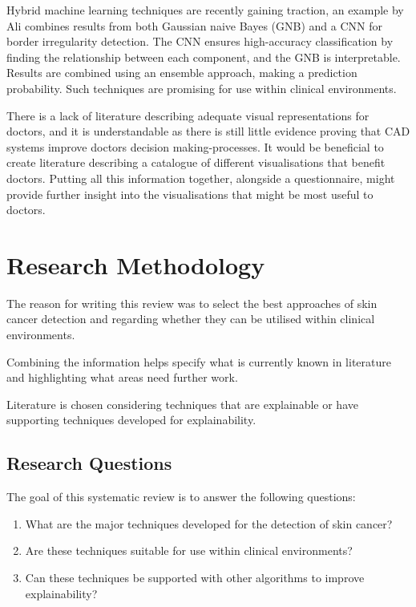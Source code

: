 Hybrid machine learning techniques are recently gaining traction, an example by Ali combines results from both Gaussian naive Bayes (GNB) and a CNN\cite{Ali2020b} for border irregularity detection. The CNN ensures high-accuracy classification by finding the relationship between each component, and the GNB is interpretable. Results are combined using an ensemble approach, making a prediction probability. Such techniques are promising for use within clinical environments.

There is a lack of literature describing adequate visual representations for doctors, and it is understandable as there is still little evidence proving that CAD systems improve doctors decision making-processes\cite{FerrantediRuffano2018}. It would be beneficial to create literature describing a catalogue of different visualisations that benefit doctors. Putting all this information together, alongside a questionnaire, might provide further insight into the visualisations that might be most useful to doctors.


\section{Research Methodology}
The reason for writing this review was to select the best approaches of skin cancer detection and regarding whether they can be utilised within clinical environments. 

Combining the information helps specify what is currently known in literature and highlighting what areas need further work.

Literature is chosen considering techniques that are explainable or have supporting techniques developed for explainability.

\subsection{Research Questions}
The goal of this systematic review is to answer the following questions:

\begin{enumerate}
	\item What are the major techniques developed for the detection of skin cancer?
	\item Are these techniques suitable for use within clinical environments?
	\item Can these techniques be supported with other algorithms to improve explainability?
\end{enumerate}

